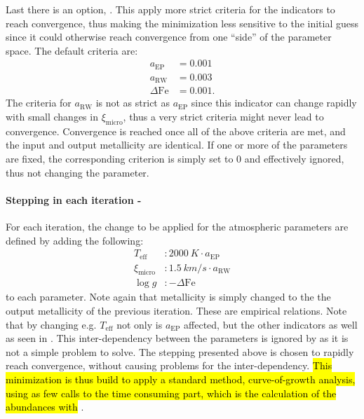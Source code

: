 Last there is an option, . This apply more strict criteria for the indicators to reach
convergence, thus making the minimization less sensitive to the initial guess since it could
otherwise reach convergence from one ``side'' of the parameter space. The default criteria are:
\begin{align*}
  a_\mathrm{EP}     &= 0.001\\
  a_\mathrm{RW}     &= 0.003\\
  \Delta\mathrm{Fe} &= 0.001.
\end{align*}
The criteria for $a_\mathrm{RW}$ is not as strict as $a_\mathrm{EP}$ since this indicator can change
rapidly with small changes in $\xi_\mathrm{micro}$, thus a very strict criteria might never lead to
convergence. Convergence is reached once all of the above criteria are met, and the input and output
metallicity are identical. If one or more of the parameters are fixed, the corresponding criterion
is simply set to 0 and effectively ignored, thus not changing the parameter.

\paragraph{Stepping in each iteration - }

For each iteration, the change to be applied for the atmospheric parameters are defined by adding
the following:
\begin{align}
  T_\mathrm{eff}     &: \SI{2000}{K} \cdot a_\mathrm{EP}   \\
  \xi_\mathrm{micro} &: \SI{1.5}{km/s} \cdot a_\mathrm{RW} \\
  \log g             &: -\Delta\mathrm{Fe}
\end{align}
to each parameter. Note again that metallicity is simply changed to the the output metallicity of
the previous iteration. These are empirical relations. Note that by changing e.g. $T_\mathrm{eff}$
not only is $a_\mathrm{EP}$ affected, but the other indicators as well as seen in .
This inter-dependency between the parameters is ignored by  as it is not a simple
problem to solve. The stepping presented above is chosen to rapidly reach convergence, without
causing problems for the inter-dependency. \hl{This minimization is thus build to apply a standard
method, curve-of-growth analysis, using as few calls to the time consuming part, which is the
calculation of the abundances with} .


